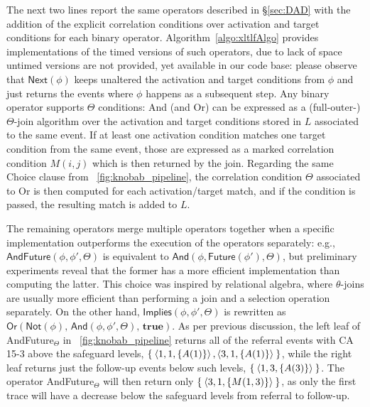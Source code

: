 The next two lines report the same operators described in \S\ref{sec:DAD} with the addition of the explicit correlation conditions over activation and target conditions for each binary operator. Algorithm~\ref{algo:xltlfAlgo} provides  implementations of the timed versions of such operators, due to lack of space untimed versions are not provided, yet available in our code base: please observe that $\textsf{Next}(\phi)$ keeps unaltered the activation and target conditions from $\phi$ and just returns the events where $\phi$ happens as a subsequent step. Any binary operator supports $\Theta$ conditions:  \textsf{And} (and \textsf{Or}) can be expressed as a (full-outer-)$\Theta$-join algorithm over the activation and target conditions stored in $L$ associated to the same event. If at least one activation condition matches one target condition from the same event, those are expressed as a marked correlation condition $M(i,j)$ which is then returned by the join. Regarding the same \textsf{Choice} clause from \figurename~\ref{fig:knobab_pipeline}, the correlation condition $\Theta$ associated to \textsf{Or} is then computed for each activation/target match, and if the condition is passed, the resulting match is added to $L$. 


The remaining operators merge multiple operators together when %
a specific implementation outperforms%
the execution of the operators separately:
 e.g., $\textsf{AndFuture}(\phi,\phi',\Theta)$ is equivalent to $\textsf{And}(\phi,\textsf{Future}(\phi'),\Theta)$, but preliminary experiments reveal that the former has a more efficient implementation than computing the latter. This choice was inspired by relational algebra, where $\theta$-joins are usually more efficient than performing a join and a selection operation separately.
 On the other hand, %
 $\textsf{Implies}(\phi,\phi',\Theta)$ is rewritten as $\textsf{Or}(\textsf{Not}(\phi),\,\textsf
{And}(\phi,\phi',\Theta),\,\textbf{true})$. As per previous discussion, the left leaf of \textsf{AndFuture}$_\Theta$ in \figurename~\ref{fig:knobab_pipeline} returns all of the referral events with CA 15-3 above the safeguard levels, $\Set{\braket{1,1,\{A(1)\}},\braket{3,1,\{A(1)\}}}$, while the right leaf returns just the follow-up events below such levels, $\Set{\braket{1,3,\{A(3)\}}}$. The operator \textsf{AndFuture}$_\Theta$ will then return only $\Set{\braket{3,1,\{M(1,3)\}}}$, as only the first trace will have a decrease below the safeguard levels from referral to follow-up.

